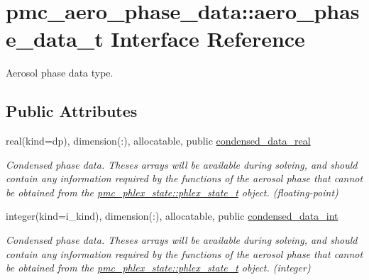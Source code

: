 \hypertarget{structpmc__aero__phase__data_1_1aero__phase__data__t}{}\section{pmc\+\_\+aero\+\_\+phase\+\_\+data\+:\+:aero\+\_\+phase\+\_\+data\+\_\+t Interface Reference}
\label{structpmc__aero__phase__data_1_1aero__phase__data__t}


Aerosol phase data type.  


\subsection*{Public Attributes}
\begin{DoxyCompactItemize}
\item 
real(kind=dp), dimension(\+:), allocatable, public \mbox{\hyperlink{structpmc__aero__phase__data_1_1aero__phase__data__t_ac8b625412bd07cc68a72269bd03c5867}{condensed\+\_\+data\+\_\+real}}
\begin{DoxyCompactList}\small\item\em Condensed phase data. Theses arrays will be available during solving, and should contain any information required by the functions of the aerosol phase that cannot be obtained from the {\ttfamily \mbox{\hyperlink{structpmc__phlex__state_1_1phlex__state__t}{pmc\+\_\+phlex\+\_\+state\+::phlex\+\_\+state\+\_\+t}}} object. (floating-\/point) \end{DoxyCompactList}\item 
integer(kind=i\+\_\+kind), dimension(\+:), allocatable, public \mbox{\hyperlink{structpmc__aero__phase__data_1_1aero__phase__data__t_a4c1266fa3485a8d000082c2dd8b15ee4}{condensed\+\_\+data\+\_\+int}}
\begin{DoxyCompactList}\small\item\em Condensed phase data. Theses arrays will be available during solving, and should contain any information required by the functions of the aerosol phase that cannot be obtained from the {\ttfamily \mbox{\hyperlink{structpmc__phlex__state_1_1phlex__state__t}{pmc\+\_\+phlex\+\_\+state\+::phlex\+\_\+state\+\_\+t}}} object. (integer) \end{DoxyCompactList}\end{DoxyCompactItemize}
